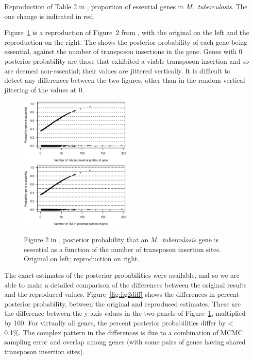 \begin{table}
\caption{Reproduction of Table 2 in \citet{lamichhane2003}, proportion
of essential genes in \emph{M.\ tuberculosis}. The one
change is indicated in red.\label{tab:tab2}}

\centering

\end{table}


Figure~\ref{fig:fig2} is a reproduction of Figure~2
from \citet{lamichhane2003}, with the original on the left and
the reproduction on the right. The shows the posterior probability of
each gene being essential, against the number of transposon insertions
in the gene. Genes with 0 posterior probability
are those that exhibited a viable transposon insertion and so are
deemed non-essential; their values are jittered vertically. It is
difficult to detect any differences between the two figures, other
than in the random vertical jittering of the values at 0.

\begin{figure}[b]
\includegraphics[viewport=44 245 525 508, width=0.50\textwidth]{../original/Nov02/R/Figs/fig2.ps}
\hfill
\includegraphics[viewport=44 245 525 508, width=0.50\textwidth]{../reproduction/Figs/fig2.ps}

\caption{Figure 2 in \citet{lamichhane2003}, posterior probability
that an \emph{M.\ tuberculosis\/} gene is essential as a function of
the number of transposon insertion sites. Original on left;
reproduction on right.\label{fig:fig2}}
\end{figure}

The exact estimates of the posterior probabilities were available, and
so we are able to make a detailed comparison of the differences
between the original results and the reproduced values.
Figure~\ref{fig:fig2diff} shows the differences in percent posterior
probability, between the original and reproduced estimates.
These are the difference between the y-axis values in the two panels
of Figure~\ref{fig:fig2}, multiplied by 100. For virtually all genes,
the percent posterior probabilities differ by < 0.1\%. The complex
pattern in the differences is due to a combination of MCMC sampling
error and overlap among genes (with some pairs of genes having shared
transposon insertion sites).

